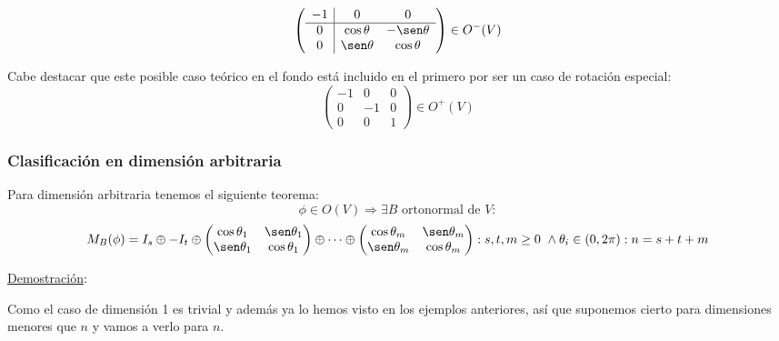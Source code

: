 \documentclass[10pt,a4paper,openright]{book}
\begin{document}
$$\left(\begin{array}{c|cc}
-1  & 0 & 0 \\
\hline
0  & \cos\theta & -\sen\theta \\
0 & \sen\theta & \cos\theta
\end{array}
\right)  \in O^- (V)$$

Cabe destacar que este posible caso teórico en el fondo está incluido en el primero por ser un caso de rotación especial:
$$\left(\begin{array}{c|cc}
-1  & 0 & 0 \\
\hline
0  & -1 & 0 \\
0 & 0 & 1 
\end{array}
\right)  \in O^+ (V)$$

\subsubsection*{Clasificación en dimensión arbitraria}

Para dimensión arbitraria tenemos el siguiente teorema:
$$\phi\in O(V)\Rightarrow \exists B \mbox{ ortonormal de }V: $$
$$M_B(\phi) = I_s \oplus -I_t \oplus \begin{pmatrix} \cos \theta_1 & \sen \theta_1 \\ \sen \theta_1 & \cos \theta_1\end{pmatrix} \oplus \cdots \oplus \begin{pmatrix} \cos \theta_m & \sen \theta_m \\ \sen \theta_m & \cos \theta_m\end{pmatrix}: s,t,m \geq 0 \ \wedge \theta_i \in (0,2\pi): n = s+t+m$$

\underline{Demostración}:

Como el caso de dimensión 1 es trivial y además ya lo hemos visto en los ejemplos anteriores, así que suponemos cierto para dimensiones menores que $n$ y vamos a verlo para $n$.
\end{document}
